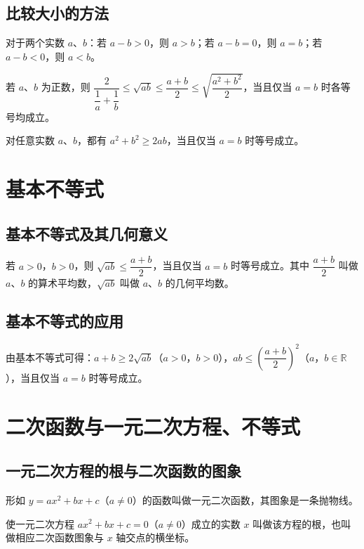 \documentclass[lang=cn,newtx,10pt,scheme=chinese,nofont]{elegantbook}
\begin{document}
\subsection{比较大小的方法}
\begin{definition}[作差法比较大小]
对于两个实数 $a$、$b$：若 $a-b>0$，则 $a>b$；若 $a-b=0$，则 $a=b$；若 $a-b<0$，则 $a<b$。
\end{definition}
\begin{theorem}[基本不等式的等价形式]
若 $a$、$b$ 为正数，则 $\dfrac{2}{\dfrac{1}{a}+\dfrac{1}{b}} \leq \sqrt{ab} \leq \dfrac{a+b}{2} \leq \sqrt{\dfrac{a^2+b^2}{2}}$，当且仅当 $a=b$ 时各等号均成立。
\end{theorem}
\begin{corollary}[重要不等式]
对任意实数 $a$、$b$，都有 $a^2+b^2 \geq 2ab$，当且仅当 $a=b$ 时等号成立。
\end{corollary}

\section{基本不等式}
\subsection{基本不等式及其几何意义}
\begin{definition}[基本不等式]
若 $a>0$，$b>0$，则 $\sqrt{ab} \leq \dfrac{a+b}{2}$，当且仅当 $a=b$ 时等号成立。其中 $\dfrac{a+b}{2}$ 叫做 $a$、$b$ 的算术平均数，$\sqrt{ab}$ 叫做 $a$、$b$ 的几何平均数。
\end{definition}
\subsection{基本不等式的应用}
\begin{definition}[基本不等式的常用变形]
由基本不等式可得：$a+b \geq 2\sqrt{ab}$（$a>0$，$b>0$），$ab \leq \left(\dfrac{a+b}{2}\right)^2$（$a$，$b \in \mathbb{R}$），当且仅当 $a=b$ 时等号成立。
\end{definition}

\section{二次函数与一元二次方程、不等式}
\subsection{一元二次方程的根与二次函数的图象}
\begin{definition}[一元二次函数]
形如 $y=ax^2+bx+c$（$a \neq 0$）的函数叫做一元二次函数，其图象是一条抛物线。
\end{definition}
\begin{definition}[一元二次方程的根]
使一元二次方程 $ax^2+bx+c=0$（$a \neq 0$）成立的实数 $x$ 叫做该方程的根，也叫做相应二次函数图象与 $x$ 轴交点的横坐标。
\end{definition}
\end{document}
